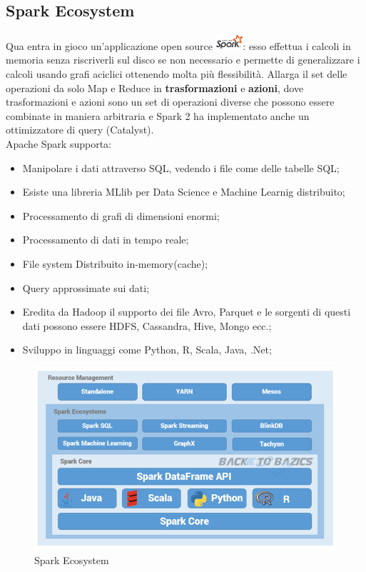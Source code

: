 \documentclass[11pt, twocolumn]{article}
\newenvironment{myitemize}
{ \begin{itemize}[topsep=0ex]
		\setlength{\itemsep}{0pt}
		\setlength{\parskip}{0pt}
		\setlength{\parsep}{0pt}     }
	{ \end{itemize}                  }
\begin{document}
\subsection{Spark Ecosystem}
Qua entra in gioco un'applicazione open source \includegraphics[width=1cm,height=0.6cm]{imgs/sparkLogo.png}: esso effettua i calcoli in memoria senza riscriverli sul disco se non necessario e permette di generalizzare i calcoli usando grafi aciclici ottenendo molta più flessibilità. Allarga il set delle operazioni da solo Map e Reduce in \textbf{trasformazioni} e \textbf{azioni}, dove trasformazioni e azioni sono un set di operazioni diverse che possono essere combinate in maniera arbitraria e Spark 2 ha implementato anche un ottimizzatore di query (Catalyst). \\
Apache Spark supporta:
\begin{myitemize}
	\item Manipolare i dati attraverso SQL, vedendo i file come delle tabelle SQL;
	\item Esiste una libreria MLlib per Data Science e Machine Learnig distribuito;
	\item Processamento di grafi di dimensioni enormi;
	\item Processamento di dati in tempo reale;
	\item File system Distribuito in-memory(cache);
	\item Query approssimate sui dati;
	\item Eredita da Hadoop il supporto dei file Avro, Parquet e le sorgenti di questi dati possono essere HDFS, Cassandra, Hive, Mongo ecc.;
	\item Sviluppo in linguaggi come Python, R, Scala, Java, .Net;
\end{myitemize}
\begin{figure}
	\centering
	\includegraphics[width=\linewidth]{imgs/Spark_eco.png}
	\caption{Spark Ecosystem}
	\label{fig:SparkEco}
\end{figure}
\end{document}
